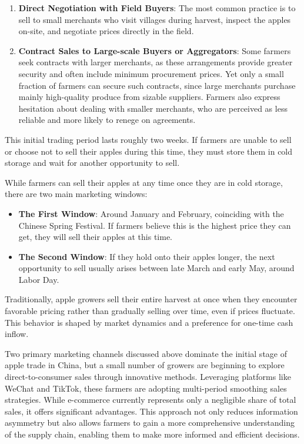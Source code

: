 \begin{enumerate}
    \item \textbf{Direct Negotiation with Field Buyers}: The most common practice is to sell to small merchants who visit villages during harvest, inspect the apples on-site, and negotiate prices directly in the field.
    \item \textbf{Contract Sales to Large-scale Buyers or Aggregators}: Some farmers seek contracts with larger merchants, as these arrangements provide greater security and often include minimum procurement prices. Yet only a small fraction of farmers can secure such contracts, since large merchants purchase mainly high-quality produce from sizable suppliers. Farmers also express hesitation about dealing with smaller merchants, who are perceived as less reliable and more likely to renege on agreements.
\end{enumerate}

This initial trading period lasts roughly two weeks. If farmers are unable to sell or choose not to sell their apples during this time, they must store them in cold storage and wait for another opportunity to sell.

While farmers can sell their apples at any time once they are in cold storage, there are two main marketing windows:

\begin{itemize}
    \item \textbf{The First Window}: Around January and February, coinciding with the Chinese Spring Festival. If farmers believe this is the highest price they can get, they will sell their apples at this time.
    \item \textbf{The Second Window}: If they hold onto their apples longer, the next opportunity to sell usually arises between late March and early May, around Labor Day.
\end{itemize}

Traditionally, apple growers sell their entire harvest at once when they encounter favorable pricing rather than gradually selling over time, even if prices fluctuate. This behavior is shaped by market dynamics and a preference for one-time cash inflow.

Two primary marketing channels discussed above dominate the initial stage of apple trade in China, but a small number of growers are beginning to explore direct-to-consumer sales through innovative methods. Leveraging platforms like WeChat and TikTok, these farmers are adopting multi-period smoothing sales strategies. While e-commerce currently represents only a negligible share of total sales, it offers significant advantages. This approach not only reduces information asymmetry but also allows farmers to gain a more comprehensive understanding of the supply chain, enabling them to make more informed and efficient decisions.


